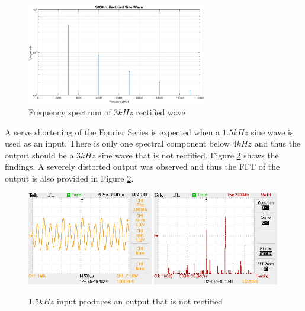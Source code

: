 \documentclass{article}
\begin{document}
\begin{figure}[H]
    \centering
    \includegraphics[width=0.7\textwidth]{3000Hz_rectified_sine_wave.eps}
    \caption{Frequency spectrum of $3kHz$ rectified wave}
    \label{fig:3000Hz_spectrum}
\end{figure}

A serve shortening of the Fourier Series is expected when a $1.5kHz$ sine wave is used as an input. There is only one spectral component below $4kHz$ and thus the output should be a $3kHz$ sine wave that is not rectified. Figure \ref{fig:3000Hz_output} shows the findings. A severely distorted output was observed and thus the FFT of the output is also provided in Figure \ref{fig:3000Hz_output}.

\begin{figure}[H]
    \centering
    \includegraphics[width=0.49\textwidth]{ex1_3000Hz_output}
    \includegraphics[width=0.49\textwidth]{ex1_3000Hz_output_FFT}
    \caption{$1.5kHz$ input produces an output that is not rectified}
    \label{fig:3000Hz_output}
\end{figure}
\end{document}
